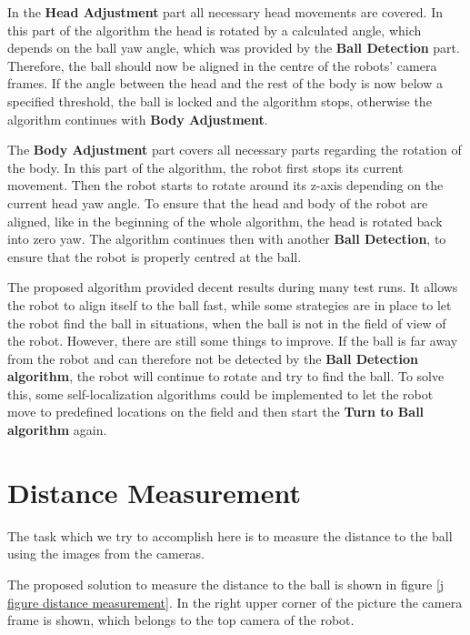 In the \textbf{Head Adjustment} part all necessary head movements are covered.
In this part of the algorithm the head is rotated by a calculated angle, which
depends on the ball yaw angle, which was provided by the \textbf{Ball
  Detection} part. Therefore, the ball should now be aligned in the centre of
the robots' camera frames. If the angle between the head and the rest of the
body is now below a specified threshold, the ball is locked and the algorithm
stops, otherwise the algorithm continues with \textbf{Body Adjustment}.

The \textbf{Body Adjustment} part covers all necessary parts regarding the
rotation of the body. In this part of the algorithm, the robot first stops its
current movement. Then the robot starts to rotate around its z-axis depending
on the current head yaw angle. To ensure that the head and body of the robot
are aligned, like in the beginning of the whole algorithm, the head is rotated
back into zero yaw. The algorithm continues then with another \textbf{Ball
  Detection}, to ensure that the robot is properly centred at the ball.

The proposed algorithm provided decent results during many test runs. It allows
the robot to align itself to the ball fast, while some strategies are in place
to let the robot find the ball in situations, when the ball is not in the
field of view of the robot. However, there are still some things to improve. If
the ball is far away from the robot and can therefore not be detected by the
\textbf{Ball Detection algorithm}, the robot will continue to rotate and try to
find the ball. To solve this, some self-localization algorithms could be
implemented to let the robot move to predefined locations on the field and then
start the \textbf{Turn to Ball algorithm} again.


\section{Distance Measurement}
\label{j sec distance measurement}

The task which we try to accomplish here is to measure the distance to the ball
using the images from the cameras.

The proposed solution to measure the distance to the ball is shown in figure
\ref{j figure distance measurement}. In the right upper corner of the picture
the camera frame is shown, which belongs to the top camera of the robot.

